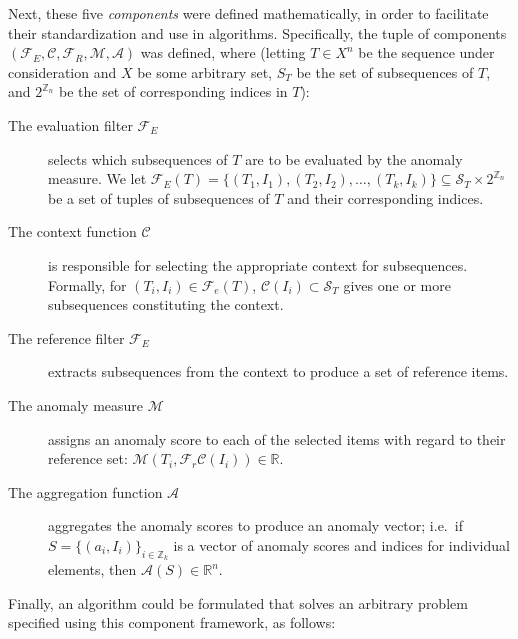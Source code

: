Next, these five \emph{components} were defined mathematically, in order to facilitate their standardization and use in algorithms. Specifically, the tuple of components $(\mathcal{F}_E, \mathcal{C}, \mathcal{F}_R, \mathcal{M},\mathcal{A})$ was defined, where (letting $T \in X^n$ be the sequence under consideration and $X$ be some arbitrary set, $S_T$ be the set of subsequences of $T$, and $2^{\mathbb{Z}_n}$ be the set of corresponding indices in $T$):
\begin{description}
   \item[The evaluation filter $\mathcal{F}_E$] selects which subsequences of $T$ are to be evaluated by the anomaly measure. We let $\mathcal{F}_E(T) = \{(T_1, I_1), (T_2, I_2), \dots, (T_k, I_k)\} \subseteq \mathcal{S}_T \times 2^{\mathbb{Z}_n}$ be a set of tuples of subsequences of $T$ and their corresponding indices.
   \item[The context function $\mathcal{C}$] is responsible for selecting the appropriate context for subsequences. Formally, for $(T_i, I_i) \in \mathcal{F}_e(T)$, $\mathcal{C}(I_i) \subset \mathcal{S}_T$ gives one or more subsequences constituting the context.
   \item[The reference filter $\mathcal{F}_E$] extracts subsequences from the context to produce a set of reference items.
   \item[The anomaly measure $\mathcal{M}$] assigns an anomaly score to each of the selected items with regard to their reference set: $\mathcal{M}(T_i, \mathcal{F}_r{\mathcal{C}(I_i)}) \in \mathbb{R}$.
   \item[The aggregation function $\mathcal{A}$] aggregates the anomaly scores to produce an anomaly vector; i.e.\  if $S = {\{(a_i, I_i)\}}_{i \in \mathbb{Z}_k}$ is a vector of anomaly scores and indices for individual elements, then $\mathcal{A}(S) \in \mathbb{R}^{n}$.
\end{description}

Finally, an algorithm could be formulated that solves an arbitrary problem specified using this component framework, as follows:
\begin{algorithmic}
     
    \EndFor{}
\end{algorithmic}

